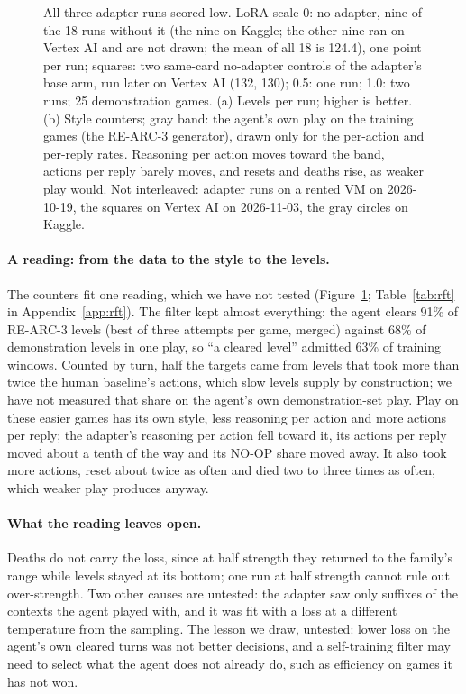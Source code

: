 \begin{figure}[t]
\centering
{}
\caption{All three adapter runs scored low. LoRA scale 0: no adapter, nine of the 18 runs without it (the nine on Kaggle; the other nine ran on Vertex AI and are not drawn; the mean of all 18 is 124.4), one point per run; squares: two same-card no-adapter controls of the adapter's base arm, run later on Vertex AI (132, 130); 0.5: one run; 1.0: two runs; 25 demonstration games. (a) Levels per run; higher is better. (b) Style counters; gray band: the agent's own play on the training games (the RE-ARC-3 generator), drawn only for the per-action and per-reply rates. Reasoning per action moves toward the band, actions per reply barely moves, and resets and deaths rise, as weaker play would. Not interleaved: adapter runs on a rented VM on 2026-10-19, the squares on Vertex AI on 2026-11-03, the gray circles on Kaggle.}\label{fig:finetune} %
\end{figure}

\paragraph{A reading: from the data to the style to the levels.}
The counters fit one reading, which we have not tested (Figure~\ref{fig:finetune}; Table~\ref{tab:rft} in Appendix~\ref{app:rft}).
The filter kept almost everything: the agent clears 91\% of RE-ARC-3 levels (best of three attempts per game, merged) against 68\% of demonstration levels in one play, so ``a cleared level'' admitted 63\% of training windows. %
Counted by turn, half the targets came from levels that took more than twice the human baseline's actions, which slow levels supply by construction; we have not measured that share on the agent's own demonstration-set play. %
Play on these easier games has its own style, less reasoning per action and more actions per reply; the adapter's reasoning per action fell toward it, its actions per reply moved about a tenth of the way and its NO-OP share moved away. %
It also took more actions, reset about twice as often and died two to three times as often, which weaker play produces anyway. %

\paragraph{What the reading leaves open.}
Deaths do not carry the loss, since at half strength they returned to the family's range while levels stayed at its bottom; one run at half strength cannot rule out over-strength. %
Two other causes are untested: the adapter saw only suffixes of the contexts the agent played with, and it was fit with a loss at a different temperature from the sampling. %
The lesson we draw, untested: lower loss on the agent's own cleared turns was not better decisions, and a self-training filter may need to select what the agent does not already do, such as efficiency on games it has not won.


